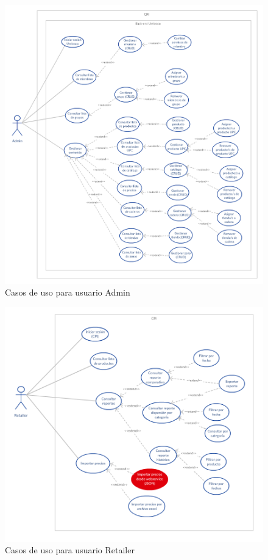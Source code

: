     \begin{figure}[H]
        \includegraphics[width=\textwidth]{cu_admin.png}
        \caption{Casos de uso para usuario Admin}
        \label{fig:cu_admin}
        \centering
    \end{figure}

    \begin{figure}[H]
        \includegraphics[scale=0.8]{cu_retailer.png}
        \caption{Casos de uso para usuario Retailer}
        \label{fig:cu_retailer}
        \centering
    \end{figure}
\pagebreak
